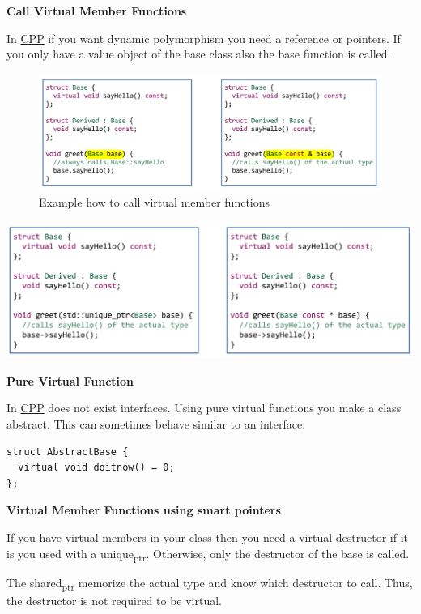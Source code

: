 \documentclass[11pt,twoside,landscape]{article}
\begin{document}
\begin{multicols}{3}
\textbf{Call Virtual Member Functions}

In \href{../../../roam/20210920103243-c.org}{CPP} if you want dynamic polymorphism you need a reference or pointers.
If you only have a value object of the base class also the base function is called.


\begin{figure}[htbp]
\centering
\includegraphics[width=.9\linewidth]{img/calling_virtual_member_functions.png}
\caption{Example how to call virtual member functions}
\end{figure}

\begin{center}
\includegraphics[width=.9\linewidth]{img/virtual_member_function2.png}
\end{center}

\textbf{Pure Virtual Function}

In \href{../../../roam/20210920103243-c.org}{CPP} does not exist interfaces.
Using pure virtual functions you make a class abstract.
This can sometimes behave similar to an interface.


\lstset{language=c++,label= ,caption= ,captionpos=b,numbers=none}
\begin{lstlisting}
struct AbstractBase {
  virtual void doitnow() = 0;
};
\end{lstlisting}

\textbf{Virtual Member Functions using smart pointers}

If you have virtual members in your class then you need a virtual destructor if it is you used with a unique\textsubscript{ptr}.
Otherwise, only the destructor of the base is called.

The shared\textsubscript{ptr} memorize the actual type and know which destructor to call.
Thus, the destructor is not required to be virtual.


\end{multicols}
\end{document}
